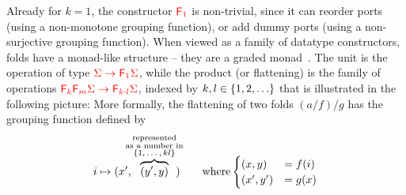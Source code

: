 Already for $k=1$, the constructor $\reduce 1$ is non-trivial, since it can reorder ports (using a non-monotone grouping function), or add dummy ports (using a non-surjective grouping function).
When viewed as a family of datatype constructors,  folds have a monad-like structure -- they are a graded  monad~\cite[p. 518]{fujiShinyaMellies2016}. The unit is the operation 
of type ${\color{red}{\Sigma \to {\color{red}{\mathsf F_{1}}}\Sigma}}$, while  the product (or flattening) is the family of operations ${\color{red}{{\color{red}{\mathsf F_{k}}}{\color{red}{\mathsf F_{m}}}\Sigma \to {\color{red}{\mathsf F_{k \cdot l}}}\Sigma}}$, indexed by $k,l \in \{1,2,\ldots\}$ that is illustrated in the following picture:
More formally, the flattening of two folds $(a/f)/g$ has the grouping function defined by
\begin{align*}
i \mapsto (x', \!\!\!\!\overbrace{(y',y)}^{\substack{\text{represented}\\ \text{as a number in}\\ \text{$\set{1,\ldots,kl}$}}}\!\!\!\!) \qquad \text{where} \begin{cases}
    (x,y) &= f(i)\\
    (x',y') &= g(x)
\end{cases}
\end{align*}



 
